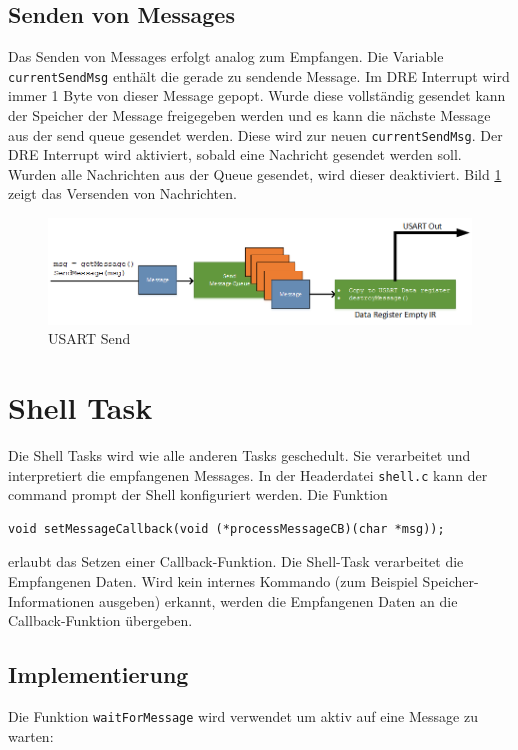 \documentclass[fontsize=12pt, toc=bibliography, notitlepage]{scrreprt}
\begin{document}
\subsection{Senden von Messages}
Das Senden von Messages erfolgt analog zum Empfangen. Die Variable \lstinline$currentSendMsg$ enthält die gerade zu sendende Message. Im DRE Interrupt wird immer 1 Byte von dieser Message gepopt. Wurde diese vollständig gesendet kann der Speicher der Message freigegeben werden und es kann die nächste Message aus der send queue gesendet werden. Diese wird zur neuen \lstinline$currentSendMsg$. Der DRE Interrupt wird aktiviert, sobald eine Nachricht gesendet werden soll. Wurden alle Nachrichten aus der Queue gesendet, wird dieser deaktiviert. Bild \ref{fig:usart_send} zeigt das Versenden von Nachrichten.

\begin{figure}[H]
	\centering
	\includegraphics[width=450px]{images/UsartOut.png}
	\caption{USART Send}
	\label{fig:usart_send}
\end{figure}

\section{Shell Task}
\label{subsec:shell-task}
Die Shell Tasks wird wie alle anderen Tasks geschedult. Sie verarbeitet und interpretiert die empfangenen Messages. In der Headerdatei \lstinline$shell.c$ kann der command prompt der Shell konfiguriert werden. Die Funktion

\begin{lstlisting}
void setMessageCallback(void (*processMessageCB)(char *msg));
\end{lstlisting}

erlaubt das Setzen einer Callback-Funktion. Die Shell-Task verarbeitet die Empfangenen Daten. Wird kein internes Kommando (zum Beispiel Speicher-Informationen ausgeben) erkannt, werden die Empfangenen Daten an die Callback-Funktion übergeben.

\subsection{Implementierung}
Die Funktion \lstinline$waitForMessage$ wird verwendet um aktiv auf eine Message zu warten:
\end{document}
